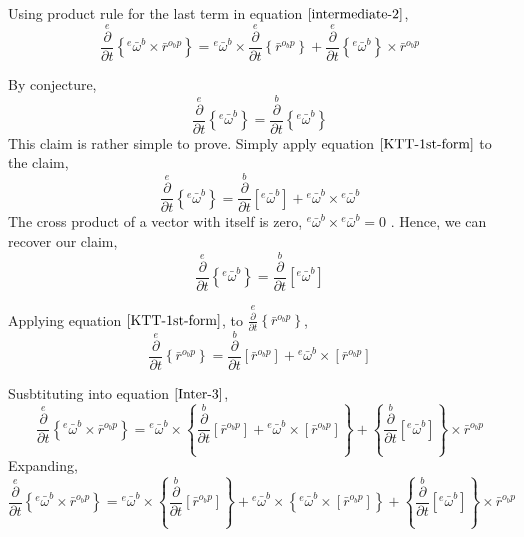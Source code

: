 \documentclass[class=report, 12pt, crop=false]{standalone}
\begin{document}
\begin{center}
Using product rule for the last term in equation $\ref{intermediate-2}$, 
\begin{equation}\overset{e}{\frac{\partial}{\partial t}}\left\{{}^{e}\bar{\omega}^{b}\times\bar{r}^{o_{b}p}\right\} = {}^{e}\bar{\omega}^{b}\times\overset{e}{\frac{\partial}{\partial t}}\left\{\bar{r}^{o_{b}p}\right\}  +  \overset{e}{\frac{\partial}{\partial t}}\left\{{}^{e}\bar{\omega}^{b}\right\}\times\bar{r}^{o_{b}p}\label{Inter-3}\end{equation}

By conjecture,
$$\overset{e}{\frac{\partial}{\partial t}}\left\{{}^{e}\bar{\omega}^{b}\right\} = \overset{b}{\frac{\partial}{\partial t}}\left\{{}^{e}\bar{\omega}^{b}\right\}$$
This claim is rather simple to prove. Simply apply equation $\ref{KTT-1st-form}$ to the claim, 
$$\overset{e}{\frac{\partial}{\partial t}}\left\{{}^{e}\bar{\omega}^{b}\right\} = \overset{b}{\frac{\partial}{\partial t}}[{}^{e}\bar{\omega}^{b}] + {}^{e}\bar{\omega}^{b}\times{}^{e}\bar{\omega}^{b}$$
The cross product of a vector with itself is zero, $\displaystyle {}^{e}\bar{\omega}^{b}\times{}^{e}\bar{\omega}^{b} = 0$ . Hence, we can recover our claim,
$$\overset{e}{\frac{\partial}{\partial t}}\left\{{}^{e}\bar{\omega}^{b}\right\} = \overset{b}{\frac{\partial}{\partial t}}[{}^{e}\bar{\omega}^{b}]$$

Applying equation $\ref{KTT-1st-form}$, to $\displaystyle \overset{e}{\frac{\partial}{\partial t}}\left\{\bar{r}^{o_{b}p}\right\}$,
$$\overset{e}{\frac{\partial}{\partial t}}\left\{\bar{r}^{o_{b}p}\right\} = \overset{b}{\frac{\partial}{\partial t}}\left[\bar{r}^{o_{b}p}\right] + {}^{e}\bar{\omega}^{b}\times\left[\bar{r}^{o_{b}p}\right]$$

Susbtituting into equation $\ref{Inter-3}$,
$$\overset{e}{\frac{\partial}{\partial t}}\left\{{}^{e}\bar{\omega}^{b}\times\bar{r}^{o_{b}p}\right\} = {}^{e}\bar{\omega}^{b}\times\left\{\overset{b}{\frac{\partial}{\partial t}}\left[\bar{r}^{o_{b}p}\right] + {}^{e}\bar{\omega}^{b}\times\left[\bar{r}^{o_{b}p}\right]\right\}    + \left\{\overset{b}{\frac{\partial}{\partial t}}[{}^{e}\bar{\omega}^{b}]\right\}\times\bar{r}^{o_{b}p}$$
Expanding,
\begin{equation}\overset{e}{\frac{\partial}{\partial t}}\left\{{}^{e}\bar{\omega}^{b}\times\bar{r}^{o_{b}p}\right\} = {}^{e}\bar{\omega}^{b}\times\left\{\overset{b}{\frac{\partial}{\partial t}}\left[\bar{r}^{o_{b}p}\right]\right\}   +   {}^{e}\bar{\omega}^{b}\times\left\{{}^{e}\bar{\omega}^{b}\times\left[\bar{r}^{o_{b}p}\right]\right\}    +    \left\{\overset{b}{\frac{\partial}{\partial t}}[{}^{e}\bar{\omega}^{b}]\right\}\times\bar{r}^{o_{b}p}\label{whammu-2}\end{equation}


\end{center}
\end{document}
